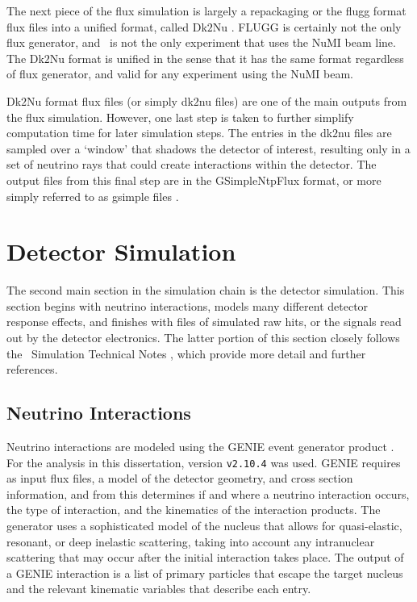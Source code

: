 The next piece of the flux simulation is largely a repackaging or the flugg format flux files into a unified format, called Dk$2$Nu \cite{ref:Dk2Nu}. FLUGG is certainly not the only flux generator, and \nova~is not the only experiment that uses the NuMI beam line. The Dk$2$Nu format is unified in the sense that it has the same format regardless of flux generator, and valid for any experiment using the NuMI beam.

Dk$2$Nu format flux files (or simply dk$2$nu files) are one of the main outputs from the flux simulation. However, one last step is taken to further simplify computation time for later simulation steps. The entries in the dk$2$nu files are sampled over a `window' that shadows the detector of interest, resulting only in a set of neutrino rays that could create interactions within the detector. The output files from this final step are in the GSimpleNtpFlux format, or more simply referred to as gsimple files \cite{ref:gsimple}.

\section{Detector Simulation}
\label{sec:SimDet}

The second main section in the simulation chain is the detector simulation. This section begins with neutrino interactions, models many different detector response effects, and finishes with files of simulated raw hits, or the signals read out by the detector electronics. The latter portion of this section closely follows the \nova~Simulation Technical Notes \cite{ref:TNDetSimFA, ref:TNDetSimSA}, which provide more detail and further references.

\subsection{Neutrino Interactions}
\label{sec:SimGENIE}

Neutrino interactions are modeled using the GENIE event generator product \cite{ref:GENIEGen, ref:GENIE}. For the analysis in this dissertation, version \verb|v2.10.4| was used. GENIE requires as input flux files, a model of the detector geometry, and cross section information, and from this determines if and where a neutrino interaction occurs, the type of interaction, and the kinematics of the interaction products. The generator uses a sophisticated model of the nucleus that allows for quasi-elastic, resonant, or deep inelastic scattering, taking into account any intranuclear scattering that may occur after the initial interaction takes place. The output of a GENIE interaction is a list of primary particles that escape the target nucleus and the relevant kinematic variables that describe each entry.

